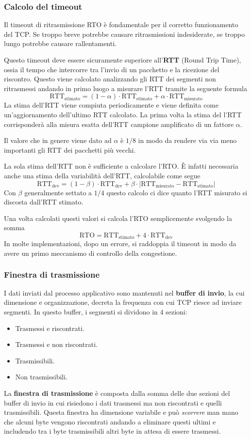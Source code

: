 \subsubsection{Calcolo del timeout}
Il timeout di ritrasmissione RTO è fondamentale per il corretto 
funzionamento del TCP. Se troppo breve potrebbe causare 
ritrasmissioni indesiderate, se troppo lungo potrebbe causare 
rallentamenti.

Questo timeout deve essere sicuramente superiore all'\textbf{RTT} 
(Round Trip Time), ossia il tempo che intercorre tra l'invio di un 
pacchetto e la ricezione del riscontro. Questo viene calcolato 
analizzando gli RTT dei segmenti non ritrasmessi andando in primo 
luogo a misurare l'RTT tramite la seguente formula
\[
	\text{RTT}_\text{stimato} = 
	(1 - \alpha) \cdot \text{RTT}_\text{stimato} +
	\alpha \cdot \text{RTT}_\text{misurato}
\]
La stima dell'RTT viene compiuta periodicamente e viene definita come 
un'aggiornamento dell'ultimo RTT calcolato. La prima volta la stima del
l'RTT corrisponderà alla misura esatta dell'RTT campione amplificato 
di un fattore $\alpha$.

Il valore che in genere viene dato ad $\alpha$ è $1/8$ in modo da 
rendere via via meno importanti gli RTT dei pacchetti più vecchi.

La sola stima dell'RTT non è sufficiente a calcolare l'RTO. \`E infatti
necessaria anche una stima della variabilità dell'RTT, calcolabile come
segue
\[
	\text{RTT}_\text{dev} = 
	(1 - \beta) \cdot \text{RTT}_\text{dev} + 
	\beta \cdot |\text{RTT}_\text{misurato} - 
	\text{RTT}_\text{stimato}|
\]
Con $\beta$ generalmente settato a $1/4$ questo calcolo ci dice quanto 
l'RTT misurato si discosta dall'RTT stimato.

Una volta calcolati questi valori si calcola l'RTO semplicemente 
svolgendo la somma 
\[
	\text{RTO} = 
	\text{RTT}_\text{stimato} + 
	4 \cdot \text{RTT}_\text{dev}
\]
In molte implementazioni, dopo un errore, si raddoppia il timeout in 
modo da avere un primo meccanismo di controllo della congestione.

\subsubsection{Finestra di trasmissione}
I dati inviati dal processo applicativo sono mantenuti nel 
\textbf{buffer di invio}, la cui dimensione e organizzazione, decreta
la frequenza con cui TCP riesce ad inviare segmenti. In questo buffer,
i segmenti si dividono in 4 sezioni:
\begin{itemize}
	\item Trasmessi e riscontrati.
	\item Trasmessi e non riscontrati.
	\item Trasmissibili.
	\item Non trasmissibili.
\end{itemize}
La \textbf{finestra di trasmissione} è composta dalla somma delle due 
sezioni del buffer di invio in cui risiedono i dati trasmessi ma non 
riscontrati e quelli trasmissibili. Questa finestra ha dimensione 
variabile e può \emph{scorrere} man mano che alcuni byte vengono 
riscontrati andando a eliminare questi ultimi e includendo tra i byte 
trasmissibili altri byte in attesa di essere trasmessi.

